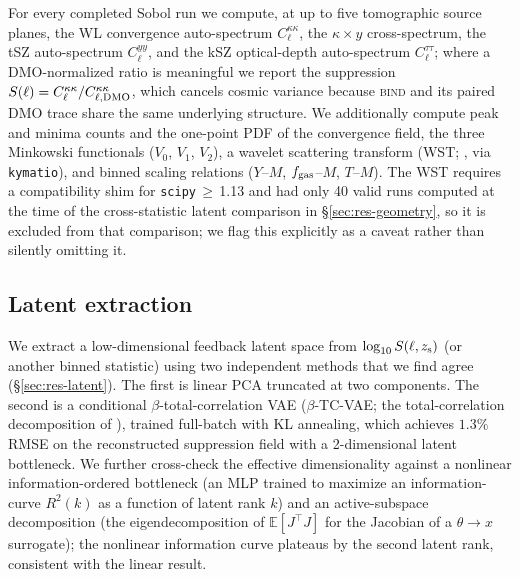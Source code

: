 \documentclass[11pt]{article}
\newcommand{\bind}{\textsc{bind}}
\newcommand{\Sell}{S(\ell)}                    %
\newcommand{\kappay}{\kappa\times y}
\newcommand{\fgas}{f_{\rm gas}}
\newcommand{\sez}{S(\ell, z_{\rm s})}
\begin{document}
For every completed Sobol run we compute, at up to five tomographic
source planes, the WL convergence auto-spectrum $C_\ell^{\kappa\kappa}$,
the $\kappay$ cross-spectrum, the tSZ auto-spectrum $C_\ell^{yy}$, and the
kSZ optical-depth auto-spectrum $C_\ell^{\tau\tau}$; where a
DMO-normalized ratio is meaningful we report the suppression $\Sell =
C_\ell^{\kappa\kappa}/C_{\ell,\rm DMO}^{\kappa\kappa}$, which cancels
cosmic variance because \bind{} and its paired DMO trace share the same
underlying structure. %
We additionally compute peak and minima counts and the one-point PDF of
the convergence field, the three Minkowski functionals ($V_0$, $V_1$,
$V_2$), a wavelet scattering transform (WST; \citealp{Cheng2020WST}, via
\texttt{kymatio}), and binned scaling relations ($Y$--$M$, $\fgas$--$M$,
$T$--$M$). %
The WST requires a compatibility shim for \texttt{scipy}$\,\geq\,$1.13 and
had only 40 valid runs computed at the time of the cross-statistic latent
comparison in \S\ref{sec:res-geometry}, so it is excluded from that
comparison; %
we flag this explicitly as a caveat rather than silently omitting it.

\subsection{Latent extraction}\label{sec:methods-latent}

We extract a low-dimensional feedback latent space from $\log_{10}\sez$
(or another binned statistic) using two independent methods that we find
agree (\S\ref{sec:res-latent}). The first is linear PCA truncated at two
components. The second is a conditional $\beta$-total-correlation VAE
($\beta$-TC-VAE; the total-correlation decomposition of
\citealp{Chen2019TCVAE}), trained full-batch with KL annealing, which
achieves $1.3\%$ RMSE on the reconstructed suppression field with a
2-dimensional latent bottleneck. %
We further cross-check the effective dimensionality against a nonlinear
information-ordered bottleneck (an MLP trained to maximize an
information-curve $R^2(k)$ as a function of latent rank $k$) and an
active-subspace decomposition (the eigendecomposition of
$\mathbb{E}[J^\top J]$ for the Jacobian of a $\theta\to x$ surrogate); the
nonlinear information curve plateaus by the second latent rank, consistent
with the linear result. %
\end{document}
